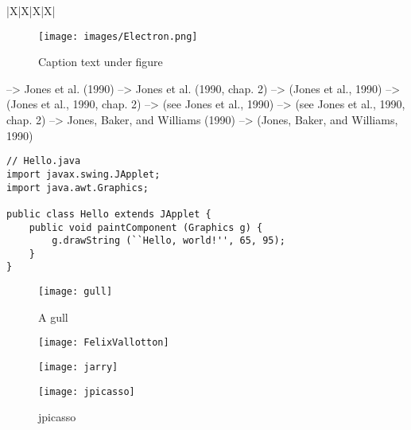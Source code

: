 \begin{table}[!htbp]
\begin{tabu}{|X|X|X|X|}
\begin{figure}[!htb] %
\centering %
\texttt{[image: images/Electron.png]}
\caption[Text for Table of Contents]{Caption text under figure}
\label{fig:Electron}
\end{figure}

\citet{jon90}	               -->    	Jones et al. (1990)
\citet[chap. 2]{jon90}	     -->    	Jones et al. (1990, chap. 2)
\citep{jon90}	               -->    	(Jones et al., 1990)
\citep[chap. 2]{jon90}	     -->    	(Jones et al., 1990, chap. 2)
\citep[see][]{jon90}	       -->    	(see Jones et al., 1990)
\citep[see][chap. 2]{jon90}	 -->    	(see Jones et al., 1990, chap. 2)
\citet*{jon90}	             -->    	Jones, Baker, and Williams (1990)
\citep*{jon90}	             -->    	(Jones, Baker, and Williams, 1990)




\begin{lstlisting}
// Hello.java
import javax.swing.JApplet;
import java.awt.Graphics;

public class Hello extends JApplet {
    public void paintComponent (Graphics g) {
        g.drawString (``Hello, world!'', 65, 95);
    }
}
\end{lstlisting}

\begin{wrapfigure}{r}{0.5\textwidth}
  \begin{center}
    \texttt{[image: gull]}
  \end{center}
  \caption{A gull}
\end{wrapfigure}

\begin{figure}
\centering
\begin{minipage}{.275\linewidth}
  \texttt{[image: FelixVallotton]}
  \caption[figure1]{FelixVallotton}
\label{img1}
\end{minipage}
\hspace{.05\linewidth}
\begin{minipage}{.275\linewidth}
  \texttt{[image: jarry]}
  \caption[figure2]{jarry}
\label{img2}
\end{minipage}
\hspace{.05\linewidth}
\begin{minipage}{.275\linewidth}
  \texttt{[image: jpicasso]}
  \caption[figure3]{jpicasso}
\label{img3}
\end{minipage}
\end{figure}



\end{tabu}
\end{table}
